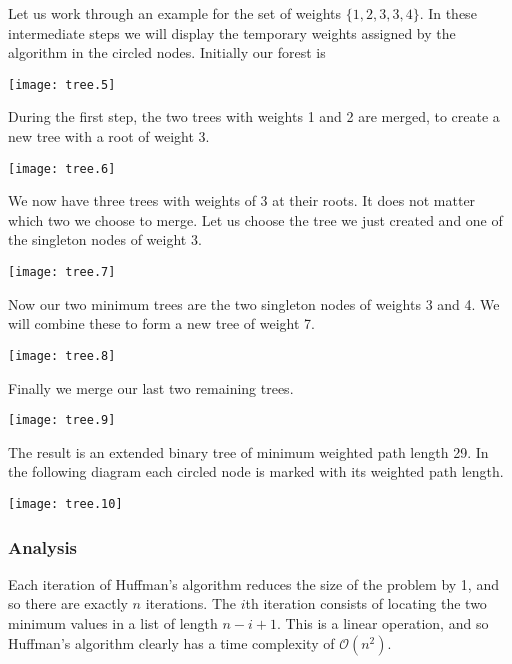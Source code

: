 \documentclass[12pt]{article}
\begin{document}
Let us work through an example for the set of weights $\{ 1, 2, 3, 3, 4 \}$.  In these intermediate steps we will display the temporary weights assigned by the algorithm in the circled nodes.  Initially our forest is

\begin{center}
\texttt{[image: tree.5]}
\end{center}

During the first step, the two trees with weights 1 and 2 are merged, to create a new tree with a root of weight 3.

\begin{center}
\texttt{[image: tree.6]}
\end{center}

We now have three trees with weights of 3 at their roots.  It does not matter which two we choose to merge.  Let us choose the tree we just created and one of the singleton nodes of weight 3.

\begin{center}
\texttt{[image: tree.7]}
\end{center}

Now our two minimum trees are the two singleton nodes of weights 3 and 4.  We will combine these to form a new tree of weight 7.

\begin{center}
\texttt{[image: tree.8]}
\end{center}

Finally we merge our last two remaining trees.

\begin{center}
\texttt{[image: tree.9]}
\end{center}

The result is an extended binary tree of minimum weighted path length 29.  In the following diagram each circled node is marked with its weighted path length.

\begin{center}
\texttt{[image: tree.10]}
\end{center}

\subsubsection*{Analysis}

Each iteration of Huffman's algorithm reduces the size of the problem by 1,
and so there are exactly $n$ iterations.
The $i$th iteration consists of locating the two minimum values in a list
of length $n - i + 1$.  This is a linear operation, and so Huffman's algorithm  clearly has a time complexity of $\mathcal{O}(n^2)$.
\end{document}

